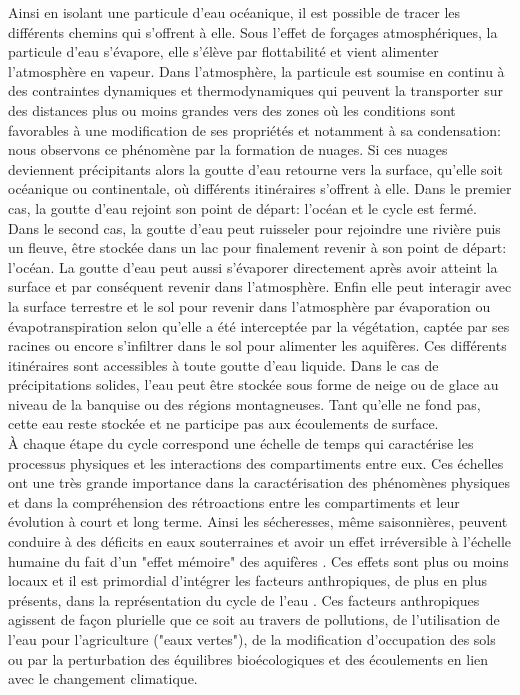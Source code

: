 Ainsi en isolant une particule d'eau océanique, il est possible de tracer les différents chemins qui s'offrent à elle. Sous l'effet de forçages atmosphériques, la particule d'eau s'évapore, elle s'élève par flottabilité et vient alimenter l'atmosphère en vapeur. Dans l'atmosphère, la particule est soumise en continu à des contraintes dynamiques et thermodynamiques qui peuvent la transporter sur des distances plus ou moins grandes vers des zones où les conditions sont favorables à une modification de ses propriétés et notamment à sa condensation: nous observons ce phénomène par la formation de nuages. Si ces nuages deviennent précipitants alors la goutte d'eau retourne vers la surface, qu'elle soit océanique ou continentale, où différents itinéraires s'offrent à elle. Dans le premier cas, la goutte d'eau rejoint son point de départ: l'océan et le cycle est fermé. Dans le second cas, la goutte d'eau peut ruisseler pour rejoindre une rivière puis un fleuve, être stockée dans un lac pour finalement revenir à son point de départ: l'océan. La goutte d'eau peut aussi s'évaporer directement après avoir atteint la surface et par conséquent revenir dans l'atmosphère. Enfin elle peut interagir avec la surface terrestre et le sol pour revenir dans l'atmosphère par évaporation ou évapotranspiration selon qu'elle a été interceptée par la végétation, captée par ses racines ou encore s'infiltrer dans le sol pour alimenter les aquifères. Ces différents itinéraires sont accessibles à toute goutte d'eau liquide. Dans le cas de précipitations solides, l'eau peut être stockée sous forme de neige ou de glace au niveau de la banquise ou des régions montagneuses. Tant qu'elle ne fond pas, cette eau reste stockée et ne participe pas aux écoulements de surface. \\

À chaque étape du cycle correspond une échelle de temps qui caractérise les processus physiques et les interactions des compartiments entre eux. Ces échelles ont une très grande importance dans la caractérisation des phénomènes physiques et dans la compréhension des rétroactions entre les compartiments et leur évolution à court et long terme. Ainsi les sécheresses, même saisonnières, peuvent conduire à des déficits en eaux souterraines et avoir un effet irréversible à l'échelle humaine du fait d'un "effet mémoire" des aquifères \citep{lam2011,cuthbert2019}. Ces effets sont plus ou moins locaux et il est primordial d'intégrer les facteurs anthropiques, de plus en plus présents, dans la représentation du cycle de l'eau \citep{abbott2019}. Ces facteurs anthropiques agissent de façon plurielle que ce soit au travers de pollutions, de l'utilisation de l'eau pour l'agriculture ("eaux vertes"), de la modification d'occupation des sols ou par la perturbation des équilibres bioécologiques et des écoulements en lien avec le changement climatique. \\

